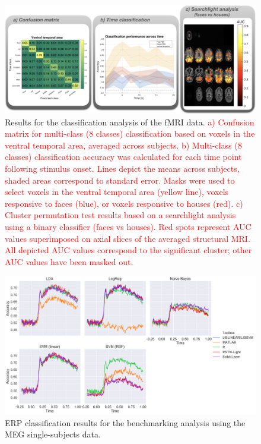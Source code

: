 \documentclass[utf8]{frontiersSCNS} %
\newcommand{\red}[1]{\textcolor{red}{#1}}
\begin{document}
\begin{figure}[ht!]
\centering\includegraphics[width=\linewidth]{fmri_results}
\caption{Results for the classification analysis of the \cite{Haxby2001} fMRI data. \red{a) Confusion matrix for multi-class (8 classes) classification based on voxels in the ventral temporal area, averaged across subjects. b) Multi-class (8 classes) classification accuracy was calculated for each time point following stimulus onset. Lines depict the means across subjects, shaded areas correspond to standard error. Masks were used to select voxels in the ventral temporal area (yellow line), voxels responsive to faces (blue), or voxels responsive to houses (red). c) Cluster permutation test results based on a searchlight analysis using a binary classifier (faces vs houses). Red spots represent AUC values superimposed on axial slices of the averaged structural MRI. All depicted AUC values correspond to the significant cluster; other AUC values have been masked out. }}\label{fig:fmri_results}
\end{figure}

\begin{figure}[ht!]
\centering\includegraphics[width=\linewidth]{benchmark_classification}
\caption{ERP classification results for the benchmarking analysis using the MEG single-subjects data.}\label{fig:benchmarking}
\end{figure}
\end{document}

